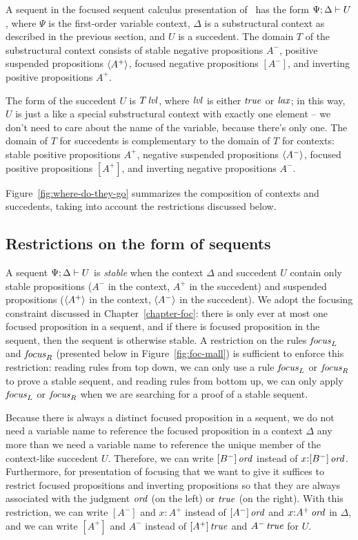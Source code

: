 A sequent in the focused sequent calculus presentation of \ollll~has
the form ${\Psi};{\Delta} \vdash {U} \mathstrut$, where $\Psi$ is the first-order
variable context, $\Delta$ is a substructural context as described in
the previous section, and $U$ is a succedent. The domain $T$ of the
substructural context consists of stable negative propositions $A^-$,
positive suspended propositions $\langle {A^+} \rangle$, focused negative
propositions $[A^-]$, and inverting positive propositions $A^+$.

The form of the succedent $U$ is ${T}\,{{\it lvl}}$, where ${\it lvl}$ is either
${\it true}$ or ${\it lax}$; in this way, $U$ is just a like a special
substructural context with exactly one element -- we don't need
to care about the name of the variable, because there's only one.  The
domain of $T$ for succedents is complementary to the domain of $T$
for contexts: stable positive propositions $A^+$, negative suspended
propositions $\langle {A^-} \rangle$, focused positive propositions $[A^+]$, and
inverting negative propositions $A^-$.

Figure~\ref{fig:where-do-they-go} summarizes the composition of
contexts and succedents, taking into account the restrictions
discussed below.

\subsection{Restrictions on the form of sequents}

A sequent ${\Psi};{\Delta} \vdash {U} \mathstrut$ is {\it stable} when the context
$\Delta$ and succedent $U$ contain only stable propositions ($A^-$ in
the context, $A^+$ in the succedent) and suspended propositions
($\langle {A^+} \rangle$ in the context, $\langle {A^-} \rangle$ in the succedent). We adopt
the focusing constraint discussed in Chapter~\ref{chapter-foc}: 
there is only ever at
most one focused proposition in a sequent, and if there is focused
proposition in the sequent, then the sequent is otherwise stable. A
restriction on the rules ${\it focus}_L$ and ${\it focus}_R$
(presented below in Figure~\ref{fig:foc-mall}) is sufficient to enforce this
restriction: reading rules from top down, we can only use a rule ${\it
  focus}_L$ or ${\it focus}_R$ to prove a stable sequent, and reading
rules from bottom up, we can only apply ${\it focus}_L$ or ${\it
  focus}_R$ when we are searching for a proof of a stable sequent.

Because there is always a distinct focused proposition in a sequent,
we do not need a variable name to reference the focused proposition in
a context $\Delta$ any more than we need a variable name to reference
the unique member of the context-like succedent $U$. Therefore, we
can write ${[B^-]}\,{{\it ord}}$ instead of $x{:}{[B^-]}\,{{\it ord}}$. Furthermore,
for presentation of focusing that we want to give it suffices to 
restrict focused propositions and inverting propositions so that
they are always associated with the judgment ${\it ord}$ (on the left)
or ${\it true}$ (on the right). With this
restriction, we can write $[A^-]$ and $x{:}A^+$ instead of
${[A^-]}\,{{\it ord}}$ and $x{:}{A^+}\,{{\it ord}}$ in $\Delta$, and we can write
$[A^+]$ and $A^-$ instead of ${[A^+]}\,{{\it true}}$ and ${A^-}\,{{\it true}}$ for
$U$.

